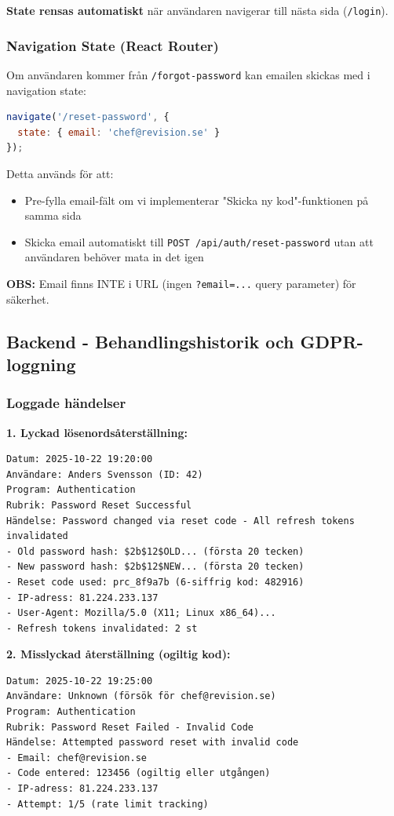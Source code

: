 \documentclass[12pt,a4paper]{article}
\begin{document}
\textbf{State rensas automatiskt} när användaren navigerar till nästa sida (\texttt{/login}).

\subsubsection{Navigation State (React Router)}
Om användaren kommer från \texttt{/forgot-password} kan emailen skickas med i navigation state:

\begin{lstlisting}[language=javascript]
navigate('/reset-password', { 
  state: { email: 'chef@revision.se' } 
});
\end{lstlisting}

Detta används för att:
\begin{itemize}[noitemsep]
  \item Pre-fylla email-fält om vi implementerar "Skicka ny kod"-funktionen på samma sida
  \item Skicka email automatiskt till \texttt{POST /api/auth/reset-password} utan att användaren behöver mata in det igen
\end{itemize}

\textbf{OBS:} Email finns INTE i URL (ingen \texttt{?email=...} query parameter) för säkerhet.

\subsection{Backend - Behandlingshistorik och GDPR-loggning}

\subsubsection{Loggade händelser}

\textbf{1. Lyckad lösenordsåterställning:}
\begin{verbatim}
Datum: 2025-10-22 19:20:00
Användare: Anders Svensson (ID: 42)
Program: Authentication
Rubrik: Password Reset Successful
Händelse: Password changed via reset code - All refresh tokens invalidated
- Old password hash: $2b$12$OLD... (första 20 tecken)
- New password hash: $2b$12$NEW... (första 20 tecken)
- Reset code used: prc_8f9a7b (6-siffrig kod: 482916)
- IP-adress: 81.224.233.137
- User-Agent: Mozilla/5.0 (X11; Linux x86_64)...
- Refresh tokens invalidated: 2 st
\end{verbatim}

\textbf{2. Misslyckad återställning (ogiltig kod):}
\begin{verbatim}
Datum: 2025-10-22 19:25:00
Användare: Unknown (försök för chef@revision.se)
Program: Authentication
Rubrik: Password Reset Failed - Invalid Code
Händelse: Attempted password reset with invalid code
- Email: chef@revision.se
- Code entered: 123456 (ogiltig eller utgången)
- IP-adress: 81.224.233.137
- Attempt: 1/5 (rate limit tracking)
\end{verbatim}
\end{document}
